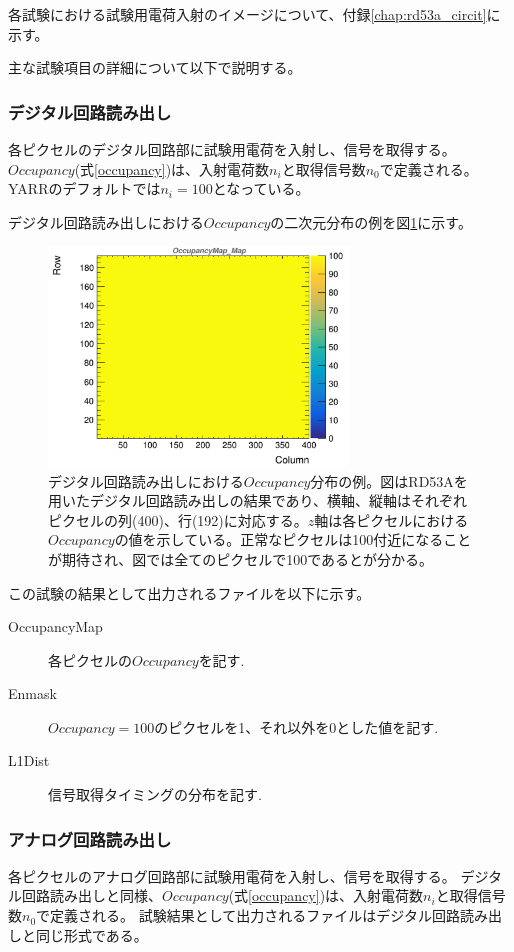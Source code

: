 各試験における試験用電荷入射のイメージについて、付録\ref{chap:rd53a_circit}に示す。

主な試験項目の詳細について以下で説明する。

\subsubsection{デジタル回路読み出し}
各ピクセルのデジタル回路部に試験用電荷を入射し、信号を取得する。
$Occupancy$(式\ref{occupancy})は、入射電荷数$n_i$と取得信号数$n_0$で定義される。
YARRのデフォルトでは$n_i=100$となっている。

デジタル回路読み出しにおける$Occupancy$の二次元分布の例を図\ref{dig_occ}に示す。
\begin{figure}[bpt]\centering
\includegraphics[width=8cm]{./dig_occ.png}
\caption[デジタル回路読み出しにおける$Occupancy$分布の例。]{デジタル回路読み出しにおける$Occupancy$分布の例。図はRD53Aを用いたデジタル回路読み出しの結果であり、横軸、縦軸はそれぞれピクセルの列(400)、行(192)に対応する。$z$軸は各ピクセルにおける$Occupancy$の値を示している。正常なピクセルは100付近になることが期待され、図では全てのピクセルで100であるとが分かる。}
\label{dig_occ}
\end{figure}

この試験の結果として出力されるファイルを以下に示す。
\begin{description}
  \item [OccupancyMap] 各ピクセルの$Occupancy$を記す.
  \item [Enmask] $Occupancy=100$のピクセルを1、それ以外を0とした値を記す.
  \item [L1Dist] 信号取得タイミングの分布を記す.
\end{description}

\subsubsection{アナログ回路読み出し}
各ピクセルのアナログ回路部に試験用電荷を入射し、信号を取得する。
デジタル回路読み出しと同様、$Occupancy$(式\ref{occupancy})は、入射電荷数$n_i$と取得信号数$n_0$で定義される。
試験結果として出力されるファイルはデジタル回路読み出しと同じ形式である。

